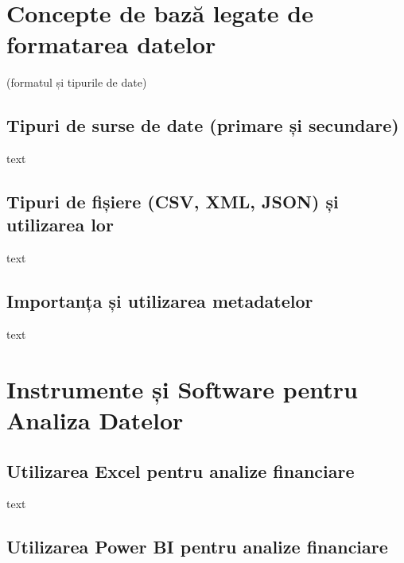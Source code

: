 \documentclass[
  11pt,
  b5paper,
  nottoc]{book}
\begin{document}
\hypertarget{concepte-de-bazux103-legate-de-formatarea-datelor-1}{%
\section{Concepte de bază legate de formatarea
datelor}\label{concepte-de-bazux103-legate-de-formatarea-datelor-1}}

(formatul și tipurile de date)

\hypertarget{tipuri-de-surse-de-date-primare-ux219i-secundare-1}{%
\subsection{Tipuri de surse de date (primare și
secundare)}\label{tipuri-de-surse-de-date-primare-ux219i-secundare-1}}

text

\hypertarget{tipuri-de-fiux219iere-csv-xml-json-ux219i-utilizarea-lor-1}{%
\subsection{Tipuri de fișiere (CSV, XML, JSON) și utilizarea
lor}\label{tipuri-de-fiux219iere-csv-xml-json-ux219i-utilizarea-lor-1}}

text

\hypertarget{importanux21ba-ux219i-utilizarea-metadatelor-1}{%
\subsection{Importanța și utilizarea
metadatelor}\label{importanux21ba-ux219i-utilizarea-metadatelor-1}}

text

\hypertarget{instrumente-ux219i-software-pentru-analiza-datelor-1}{%
\section{Instrumente și Software pentru Analiza
Datelor}\label{instrumente-ux219i-software-pentru-analiza-datelor-1}}

\hypertarget{utilizarea-excel-pentru-analize-financiare-1}{%
\subsection{Utilizarea Excel pentru analize
financiare}\label{utilizarea-excel-pentru-analize-financiare-1}}

text

\hypertarget{utilizarea-power-bi-pentru-analize-financiare-1}{%
\subsection{Utilizarea Power BI pentru analize
financiare}\label{utilizarea-power-bi-pentru-analize-financiare-1}}
\end{document}
